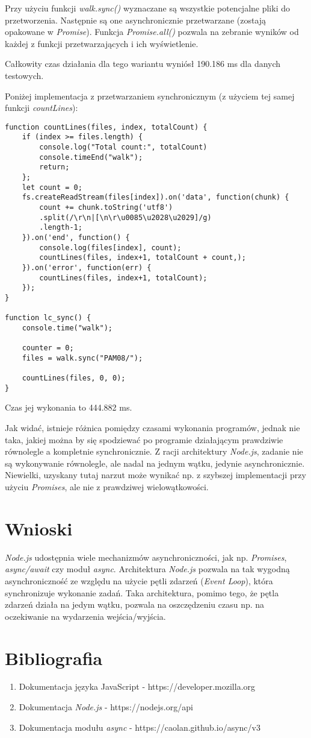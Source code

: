 \documentclass{article}
\begin{document}
Przy użyciu funkcji \textit{walk.sync()} wyznaczane są wszystkie potencjalne pliki do przetworzenia.
Następnie są one asynchronicznie przetwarzane (zostają opakowane w \textit{Promise}). Funkcja
\textit{Promise.all()} pozwala na zebranie wyników od każdej z funkcji przetwarzających i ich wyświetlenie.

Całkowity czas działania dla tego wariantu wyniósł 190.186 ms dla danych testowych.

Poniżej implementacja z przetwarzaniem synchronicznym (z użyciem tej samej funkcji \textit{countLines}):

\begin{verbatim}
function countLines(files, index, totalCount) {
    if (index >= files.length) {
        console.log("Total count:", totalCount)
        console.timeEnd("walk");
        return;
    };
    let count = 0;
    fs.createReadStream(files[index]).on('data', function(chunk) {
        count += chunk.toString('utf8')
        .split(/\r\n|[\n\r\u0085\u2028\u2029]/g)
        .length-1;
    }).on('end', function() {
        console.log(files[index], count);
        countLines(files, index+1, totalCount + count,);
    }).on('error', function(err) {
        countLines(files, index+1, totalCount);
    });
}

function lc_sync() {
    console.time("walk");

    counter = 0;
    files = walk.sync("PAM08/");

    countLines(files, 0, 0);
}
\end{verbatim}

Czas jej wykonania to 444.882 ms.

Jak widać, istnieje różnica pomiędzy czasami wykonania programów, jednak nie taka, jakiej można by się
spodziewać po programie działającym prawdziwie równolegle a kompletnie synchronicznie. Z racji architektury
\textit{Node.js}, zadanie nie są wykonywanie równolegle, ale nadal na jednym wątku, jedynie asynchronicznie.
Niewielki, uzyskany tutaj narzut może wynikać np. z szybszej implementacji przy użyciu \textit{Promises}, ale nie
z prawdziwej wielowątkowości.

\section{Wnioski}

\textit{Node.js} udostępnia wiele mechanizmów asynchroniczności, jak np. \textit{Promises}, \textit{async/await} 
czy moduł \textit{async}. Architektura \textit{Node.js} pozwala na tak wygodną asynchroniczność 
ze względu na użycie pętli zdarzeń (\textit{Event Loop}), która synchronizuje wykonanie zadań. Taka 
architektura, pomimo tego, że pętla zdarzeń działa na jedym wątku, pozwala na oszczędzeniu czasu np.
na oczekiwanie na wydarzenia wejścia/wyjścia.

\section{Bibliografia}

\begin{enumerate}
    \item 
    Dokumentacja języka JavaScript - https://developer.mozilla.org
    \item
    Dokumentacja \textit{Node.js} - https://nodejs.org/api
    \item
    Dokumentacja modułu \textit{async} - https://caolan.github.io/async/v3
\end{enumerate}
\end{document}
